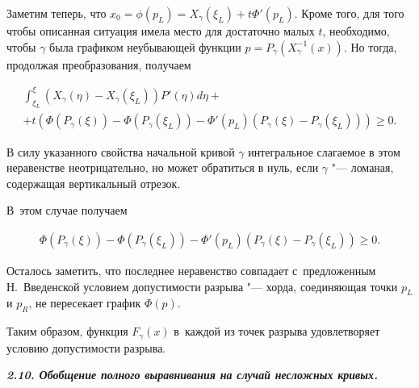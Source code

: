 Заметим теперь, что $x_0=\phi(p_L)=X_{\gamma}(\xi_L)+t\Phi'(p_L)$. Кроме того, для того чтобы описанная ситуация имела место для достаточно малых $t$, необходимо, чтобы $\gamma$ была графиком неубывающей функции $p=P_{\gamma}(X^{-1}_{\gamma}(x))$. Но тогда, продолжая преобразования, получаем

\begin{multline}

\int _{\xi_L}^{\xi}(X_{\gamma}(\eta)-X_{\gamma}(\xi_L))P'(\eta)d\eta+ \\ 

+ t(\Phi(P_{\gamma}(\xi))-\Phi(P_{\gamma}(\xi_L))-\Phi'(p_L)(P_{\gamma}(\xi)-P_{\gamma}(\xi_L)))\ge0.

\end{multline}



В силу указанного свойства начальной кривой $\gamma$ интегральное слагаемое в этом неравенстве неотрицательно, но может обратиться в нуль, если $\gamma$ "--- ломаная, содержащая вертикальный отрезок. 

В~этом случае получаем

\begin{gather}

\Phi(P_{\gamma}(\xi))-\Phi(P_{\gamma}(\xi_L))-\Phi'(p_L)(P_{\gamma}(\xi)-P_{\gamma}(\xi_L))\ge0.\label{eq-correctness-Vvedenskaja}

\end{gather}



Осталось заметить, что последнее неравенство совпадает с~предложенным Н.~Введенской \cite{Vvedenskaja} условием допустимости разрыва "--- хорда, соединяющая точки $p_L$ и $p_R$, не пересекает график $\Phi(p)$. 

Таким образом, функция $F_{\gamma}(x)$ в~каждой из точек разрыва удовлетворяет условию допустимости разрыва.



\smallskip









{\bf \itshape 2.10. Обобщение полного выравнивания на случай несложных кривых.}



\hypertarget{palin:definition11}{}



